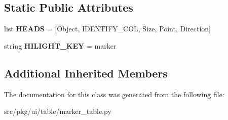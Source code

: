 \subsection*{Static Public Attributes}
\begin{DoxyCompactItemize}
\item 
\mbox{\label{classrnb-planning_1_1src_1_1pkg_1_1ui_1_1table_1_1marker__table_1_1_marker_table_a824085fa52b4756f83c7482ef6746848}} 
list {\bfseries H\+E\+A\+DS} = \mbox{[}\textquotesingle{}Object\textquotesingle{}, I\+D\+E\+N\+T\+I\+F\+Y\+\_\+\+C\+OL, \textquotesingle{}Size\textquotesingle{}, \textquotesingle{}Point\textquotesingle{}, \textquotesingle{}Direction\textquotesingle{}\mbox{]}
\item 
\mbox{\label{classrnb-planning_1_1src_1_1pkg_1_1ui_1_1table_1_1marker__table_1_1_marker_table_a460ddc0dc600bd4f91506a6b186dd587}} 
string {\bfseries H\+I\+L\+I\+G\+H\+T\+\_\+\+K\+EY} = \textquotesingle{}marker\textquotesingle{}
\end{DoxyCompactItemize}
\subsection*{Additional Inherited Members}


The documentation for this class was generated from the following file\+:\begin{DoxyCompactItemize}
\item 
src/pkg/ui/table/marker\+\_\+table.\+py\end{DoxyCompactItemize}

